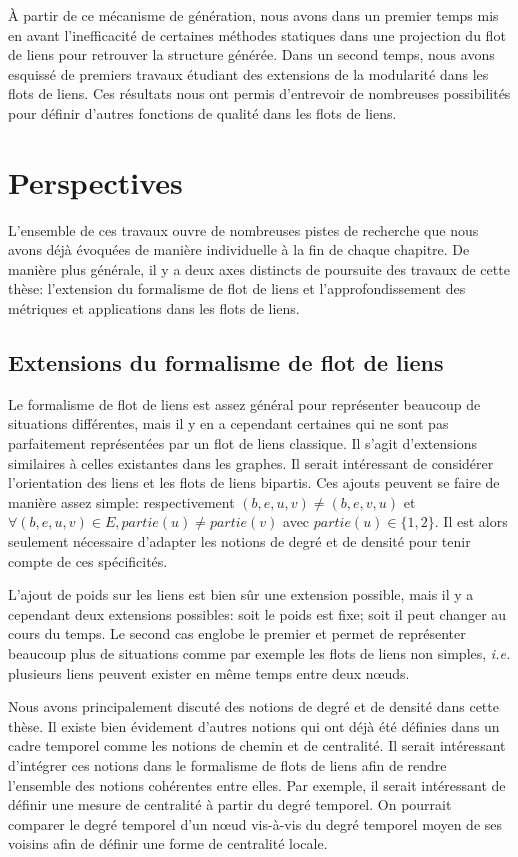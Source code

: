 \`A partir de ce mécanisme de génération, nous avons dans un premier temps mis en avant l'inefficacité de certaines méthodes statiques dans une projection du flot de liens pour retrouver la structure générée.
Dans un second temps, nous avons esquissé de premiers travaux étudiant des extensions de la modularité dans les flots de liens.
Ces résultats nous ont permis d'entrevoir de nombreuses possibilités pour définir d'autres fonctions de qualité dans les flots de liens.

\section{Perspectives}

L'ensemble de ces travaux ouvre de nombreuses pistes de recherche que nous avons déjà évoquées de manière individuelle à la fin de chaque chapitre.
De manière plus générale, il y a deux axes distincts de poursuite des travaux de cette thèse: l'extension du formalisme de flot de liens et l'approfondissement des métriques et applications dans les flots de liens.

\subsection{Extensions du formalisme de flot de liens}

Le formalisme de flot de liens est assez général pour représenter beaucoup de situations différentes, mais il y en a cependant certaines qui ne sont pas parfaitement représentées par un flot de liens classique.
Il s'agit d'extensions similaires à celles existantes dans les graphes.
Il serait intéressant de considérer l'orientation des liens et les flots de liens bipartis.
Ces ajouts peuvent se faire de manière assez simple: respectivement $(b,e,u,v)\neq (b,e,v,u)$ et $\forall (b,e,u,v) \in E, partie(u)\neq partie(v)$ avec $partie(u) \in \{1,2\}$.
Il est alors seulement nécessaire d'adapter les notions de degré et de densité pour tenir compte de ces spécificités.

L'ajout de poids sur les liens est bien sûr une extension possible, mais il y a cependant deux extensions possibles: soit le poids est fixe; soit il peut changer au cours du temps.
Le second cas englobe le premier et permet de représenter beaucoup plus de situations comme par exemple les flots de liens non simples, \emph{i.e.} plusieurs liens peuvent exister en même temps entre deux n\oe{}uds.

Nous avons principalement discuté des notions de degré et de densité dans cette thèse.
Il existe bien évidement d'autres notions qui ont déjà été définies dans un cadre temporel comme les notions de chemin et de centralité.
Il serait intéressant d'intégrer ces notions dans le formalisme de flots de liens afin de rendre l'ensemble des notions cohérentes entre elles.
Par exemple, il serait intéressant de définir une mesure de centralité à partir du degré temporel.
On pourrait comparer le degré temporel d'un n\oe{}ud vis-à-vis du degré temporel moyen de ses voisins afin de définir une forme de centralité locale.

